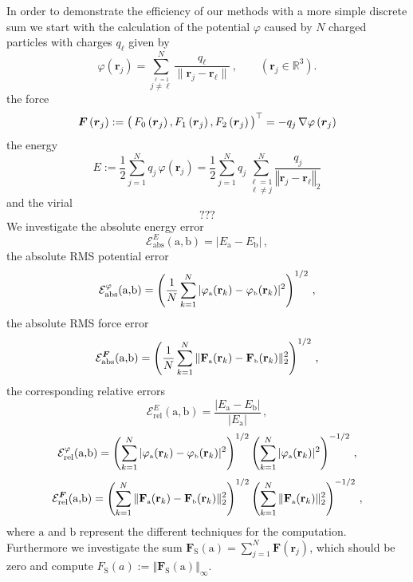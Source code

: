 In order to demonstrate the efficiency of our methods with a more
simple discrete sum we start with the calculation of the potential
$\varphi$ caused by $N$ charged particles with charges $q_\ell$ given
by
\[
  \varphi(\mathbf r_j) =
  \sum_{\overset{\ell=1}{j\not=\ell}}^{N} \frac{q_\ell}{\|\mathbf r_j-\mathbf
  r_{\ell}\|}\, , \qquad (\mathbf r_j\in {\mathbb R}^3). 
\]
the force
\[
  \boldsymbol{F}\left(\boldsymbol{r}_j\right) :=
  \left(\rule{0pt}{2.0ex}\, F_0\left(\boldsymbol{r}_j\right),F_1\left(\boldsymbol{r}_j\right), F_2\left(\boldsymbol{r}_j\right)\, \right)^\top =
  - q_j \, \nabla \varphi\left(\boldsymbol{r}_j\right)
\]
the energy
\[
  E := \frac{1}{2} \sum\limits_{j=1}^{N} q_j \,
  \varphi\left(\boldsymbol{r}_j\right) = 
  \frac{1}{2} \sum\limits_{j=1}^{N} q_j \, 
  \underset{\ell\neq j}{\sum\limits_{\ell=1}^{N}} 
  \frac{q_j}{\left\Vert \boldsymbol{r}_j - 
  \boldsymbol{r}_\ell \right\Vert_2}
\]
and the virial
\[
 ???
\]
We investigate the absolute energy error
\[
  \mathcal{E}_{\mathrm{abs}}^{E}(\mathrm{a},\mathrm{b})
  = |E_{\mathrm{a}}-E_{\mathrm{b}}|\, ,
\]
 the absolute RMS potential error
\[
  \mathcal{E}^{\varphi}_{\mathrm{abs}}(\mbox{a,b})
  = \left(\frac{1}{N} \sum_{k=1}^{N} |\varphi_{\mbox{\tiny a}}
  (\mathbf r_k)-\varphi_{\mbox{\tiny b}}(\mathbf r_k)|^2\right)^{1/2} \, ,
\]
the absolute RMS force error
\[
  \mathcal{E}_{\mathrm{abs}}^{\boldsymbol F}(\mbox{a,b})
  = \left(\frac{1}{N}
    \sum_{k=1}^{N} \|\mathbf F_{\mbox{\tiny a}}(\mathbf r_k)-\mathbf F_{\mbox{\tiny b}}(\mathbf r_k)\|^2_2\right)^{1/2}\, ,
\]
the corresponding relative errors
\[
  \mathcal{E}_{\mathrm{rel}}^{E}(\mathrm{a},\mathrm{b})
  = \frac{|E_{\mathrm{a}}-E_{\mathrm{b}}|}{|E_{\mathrm{a}}|}\, ,
\]
\[
  \mathcal{E}^{\varphi}_{\mathrm{rel}}(\mbox{a,b}) = \left(\displaystyle \sum_{k=1}^{N} |\varphi_{\mbox{\tiny a}}
  (\mathbf r_k)-\varphi_{\mbox{\tiny b}}(\mathbf r_k)|^2\right)^{1/2}
  \left(\displaystyle\sum_{k=1}^{N}|\varphi_{\mbox{\tiny a}}(\mathbf r_k)|^2\right)^{-1/2}\, ,
\]
\[
  \mathcal{E}_{\mathrm{rel}}^{\boldsymbol F}(\mbox{a,b})
  = \left(\displaystyle
    \sum_{k=1}^{N} \|\mathbf F_{\mbox{\tiny a}}(\mathbf r_k)-\mathbf F_{\mbox{\tiny b}}(\mathbf r_k)\|^2_2\right)^{1/2}
    \left(\displaystyle\sum_{k=1}^{N}\|\mathbf F_{\mbox{\tiny a}}(\mathbf r_k) \|^2_2\right)^{-1/2}\, ,
\]
where $\mathrm{a}$ and $\mathrm{b}$ represent the different techniques
for the computation.  Furthermore we investigate the sum
$\boldsymbol{F}_\mathrm{S}(\mathrm{a}) = \sum_{j=1}^{N}
\boldsymbol{F}\left(\boldsymbol{r}_j\right)$, which should be zero and
compute $F_\mathrm{S}(a) := \left\Vert
  \boldsymbol{F}_\mathrm{S}(\mathrm{a}) \right\Vert_\infty$.

